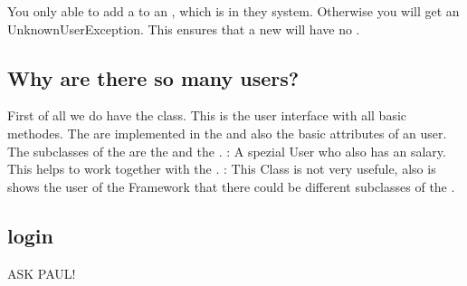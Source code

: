 You only able to add a  to an , which is in they system. Otherwise you will get an UnknownUserException.
This ensures that a new  will have no .

\subsection{Why are there so many users?}
First of all we do have the  class. This is the user interface with all basic methodes. The are implemented in the
 and also the basic attributes of an user.
The subclasses of the  are the  and the .
: A spezial User who also has an salary. This helps to work together with the .
: This Class is not very usefule, also is shows the user of the Framework that there could be different subclasses of the .


\subsection{login}

ASK PAUL!





